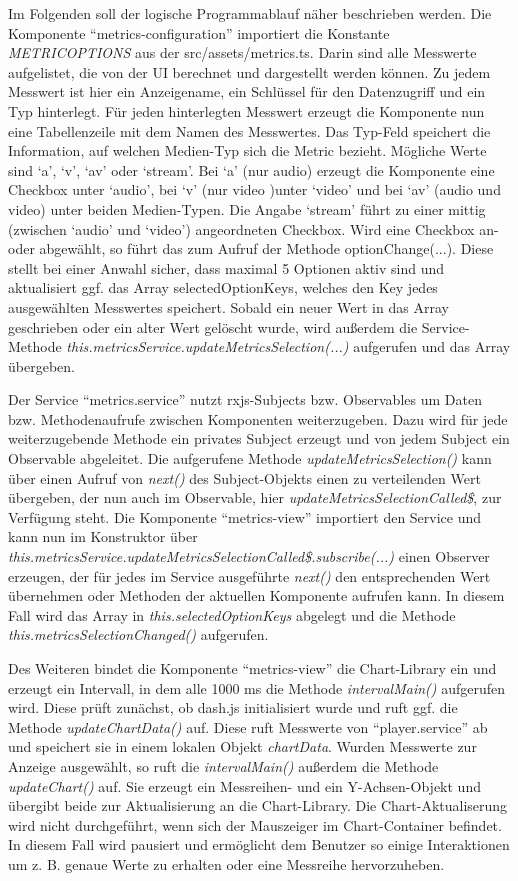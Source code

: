 \documentclass[conference]{IEEEtran}
\begin{document}
Im Folgenden soll der logische Programmablauf näher beschrieben werden. Die Komponente ``metrics-configuration'' importiert die Konstante \emph{METRICOPTIONS} aus der src/assets/metrics.ts. Darin sind alle Messwerte aufgelistet, die von der UI berechnet und dargestellt werden können. Zu jedem Messwert ist hier ein Anzeigename, ein Schlüssel für den Datenzugriff und ein Typ hinterlegt. Für jeden hinterlegten Messwert erzeugt die Komponente nun eine Tabellenzeile mit dem Namen des Messwertes. Das Typ-Feld speichert die Information, auf welchen Medien-Typ sich die Metric bezieht. Mögliche Werte sind `a', `v', `av' oder `stream'. Bei `a' (nur audio) erzeugt die Komponente eine Checkbox unter `audio', bei `v' (nur video )unter `video' und bei `av' (audio und video) unter beiden Medien-Typen. Die Angabe `stream' führt zu einer mittig (zwischen `audio' und `video') angeordneten Checkbox. Wird eine Checkbox an- oder abgewählt, so führt das zum Aufruf der Methode optionChange(...). Diese stellt bei einer Anwahl sicher, dass maximal 5 Optionen aktiv sind und aktualisiert ggf. das Array selectedOptionKeys, welches den Key jedes ausgewählten Messwertes speichert. Sobald ein neuer Wert in das Array geschrieben oder ein alter Wert gelöscht wurde, wird außerdem die Service-Methode \emph{this.metricsService.updateMetricsSelection(...)} aufgerufen und das Array übergeben.

Der Service ``metrics.service'' nutzt rxjs-Subjects bzw. Observables um Daten bzw. Methodenaufrufe zwischen Komponenten weiterzugeben. Dazu wird für jede weiterzugebende Methode ein privates Subject erzeugt und von jedem Subject ein Observable abgeleitet. Die aufgerufene Methode \emph{updateMetricsSelection()} kann über einen Aufruf von \emph{next()} des Subject-Objekts einen zu verteilenden Wert übergeben, der nun auch im Observable, hier \emph{updateMetricsSelectionCalled\$}, zur Verfügung steht. Die Komponente ``metrics-view'' importiert den Service und kann nun im Konstruktor über \emph{this.metricsService.updateMetricsSelectionCalled\$.subscribe(...)} einen Observer erzeugen, der für jedes im Service ausgeführte \emph{next()} den entsprechenden Wert übernehmen oder Methoden der aktuellen Komponente aufrufen kann. In diesem Fall wird das Array in \emph{this.selectedOptionKeys} abgelegt und die Methode \emph{this.metricsSelectionChanged()} aufgerufen.

Des Weiteren bindet die Komponente ``metrics-view'' die Chart-Library ein und erzeugt ein Intervall, in dem alle 1000 ms die Methode \emph{intervalMain()} aufgerufen wird. Diese prüft zunächst, ob dash.js initialisiert wurde und ruft ggf. die Methode \emph{updateChartData()} auf. Diese ruft Messwerte von ``player.service'' ab und speichert sie in einem lokalen Objekt \emph{chartData}. Wurden Messwerte zur Anzeige ausgewählt, so ruft die \emph{intervalMain()} außerdem die Methode \emph{updateChart()} auf. Sie erzeugt ein Messreihen- und ein Y-Achsen-Objekt und übergibt beide zur Aktualisierung an die Chart-Library. Die Chart-Aktualiserung wird nicht durchgeführt, wenn sich der Mauszeiger im Chart-Container befindet. In diesem Fall wird pausiert und ermöglicht dem Benutzer so einige Interaktionen um z. B. genaue Werte zu erhalten oder eine Messreihe hervorzuheben.
\end{document}
